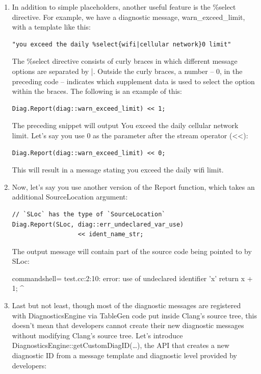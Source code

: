 \begin{enumerate}
\item In addition to simple placeholders, another useful feature is the \%select directive. For example, we have a diagnostic message, warn\_exceed\_limit, with a template like this:

\begin{lstlisting}[style=styleJavaScript]
"you exceed the daily %select{wifi|cellular network}0 limit"
\end{lstlisting}

The \%select directive consists of curly braces in which different message options are separated by |. Outside the curly braces, a number – 0, in the preceding code – indicates which supplement data is used to select the option within the braces. The following is an example of this:

\begin{lstlisting}[style=styleJavaScript]
Diag.Report(diag::warn_exceed_limit) << 1;
\end{lstlisting}

The preceding snippet will output You exceed the daily cellular network limit. Let's say you use 0 as the parameter after the stream operator (<<):

\begin{lstlisting}[style=styleJavaScript]
Diag.Report(diag::warn_exceed_limit) << 0;
\end{lstlisting}

This will result in a message stating you exceed the daily wifi limit.

\item Now, let's say you use another version of the Report function, which takes an additional SourceLocation argument:

\begin{lstlisting}[style=styleJavaScript]
// `SLoc` has the type of `SourceLocation`
Diag.Report(SLoc, diag::err_undeclared_var_use)
                  << ident_name_str;
\end{lstlisting}

The output message will contain part of the source code being pointed to by SLoc:

\begin{tcblisting}{commandshell={}}
test.cc:2:10: error: use of undeclared identifier 'x'
  return x + 1;
          ^
\end{tcblisting}

\item Last but not least, though most of the diagnostic messages are registered with DiagnosticsEngine via TableGen code put inside Clang's source tree, this doesn't mean that developers cannot create their new diagnostic messages without modifying Clang's source tree. Let's introduce DiagnosticsEngine::getCustomDiagID(…), the API that creates a new diagnostic ID from a message template and diagnostic level provided by developers:


\end{enumerate}
